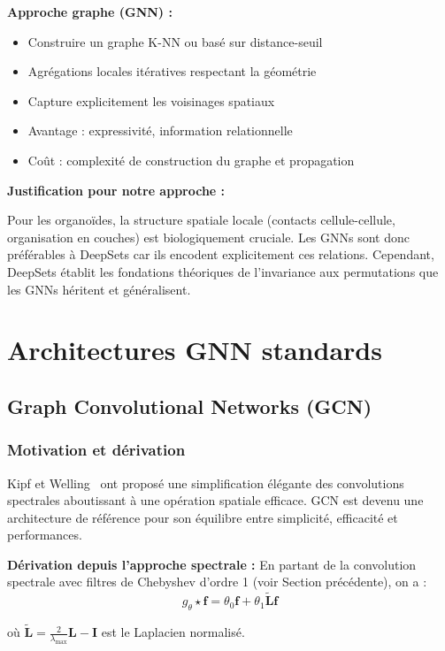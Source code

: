 \textbf{Approche graphe (GNN) :}
\begin{itemize}
    \item Construire un graphe K-NN ou basé sur distance-seuil
    \item Agrégations locales itératives respectant la géométrie
    \item Capture explicitement les voisinages spatiaux
    \item Avantage : expressivité, information relationnelle
    \item Coût : complexité de construction du graphe et propagation
\end{itemize}

\textbf{Justification pour notre approche :}

Pour les organoïdes, la structure spatiale locale (contacts cellule-cellule, organisation en couches) est biologiquement cruciale. Les GNNs sont donc préférables à DeepSets car ils encodent explicitement ces relations. Cependant, DeepSets établit les fondations théoriques de l'invariance aux permutations que les GNNs héritent et généralisent.

\section{Architectures GNN standards}

\subsection{Graph Convolutional Networks (GCN)}

\subsubsection{Motivation et dérivation}

Kipf et Welling~\cite{Kipf2017} ont proposé une simplification élégante des convolutions spectrales aboutissant à une opération spatiale efficace. GCN est devenu une architecture de référence pour son équilibre entre simplicité, efficacité et performances.

\textbf{Dérivation depuis l'approche spectrale :}
En partant de la convolution spectrale avec filtres de Chebyshev d'ordre 1 (voir Section précédente), on a :
\[
g_\theta \star \mathbf{f} = \theta_0 \mathbf{f} + \theta_1 \tilde{\mathbf{L}} \mathbf{f}
\]

où $\tilde{\mathbf{L}} = \frac{2}{\lambda_{\max}}\mathbf{L} - \mathbf{I}$ est le Laplacien normalisé.

